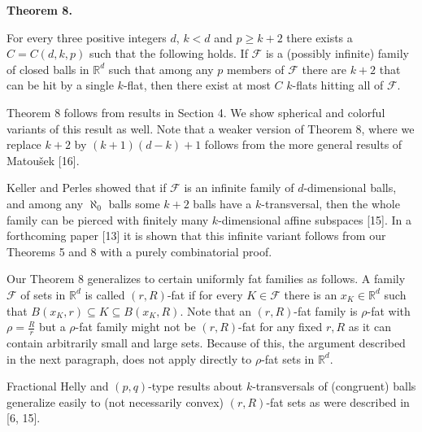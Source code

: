 \par
\par
\par\medskip\noindent\textbf{Theorem 8.}\par
For every three positive integers $d$, $k<d$ and $p\geq k+2$ there exists a $C=C(d,k,p)$ such that the following holds. If $\mathcal{F}$ is a (possibly infinite) family of closed balls in $\mathbb{R}^{d}$ such that among any $p$ members of $\mathcal{F}$ there are $k+2$ that can be hit by a single $k$-flat, then there exist at most $C$ $k$-flats hitting all of $\mathcal{F}$.
\par
\par
\par
Theorem 8 follows from results in Section 4. We show spherical and colorful variants of this result as well. Note that a weaker version of Theorem 8, where we replace $k+2$ by $(k+1)(d-k)+1$ follows from the more general results of Matoušek [16].
\par
\par
Keller and Perles showed that if $\mathcal{F}$ is an infinite family of $d$-dimensional balls, and among any $\aleph_{0}$ balls some $k+2$ balls have a $k$-transversal, then the whole family can be pierced with finitely many $k$-dimensional affine subspaces [15]. In a forthcoming paper [13] it is shown that this infinite variant follows from our Theorems 5 and 8 with a purely combinatorial proof.
\par
\par
Our Theorem 8 generalizes to certain uniformly fat families as follows. A family $\mathcal{F}$ of sets in $\mathbb{R}^{d}$ is called $(r,R)$-fat if for every $K\in\mathcal{F}$ there is an $x_{K}\in\mathbb{R}^{d}$ such that $B(x_{K},r)\subseteq K\subseteq B(x_{K},R)$. Note that an $(r,R)$-fat family is $\rho$-fat with $\rho=\frac{R}{r}$ but a $\rho$-fat family might not be $(r,R)$-fat for any fixed $r,R$ as it can contain arbitrarily small and large sets. Because of this, the argument described in the next paragraph, does not apply directly to $\rho$-fat sets in $\mathbb{R}^{d}$.
\par
\par
Fractional Helly and $(p,q)$-type results about $k$-transversals of (congruent) balls generalize easily to (not necessarily convex) $(r,R)$-fat sets as were described in [6, 15].
\par
